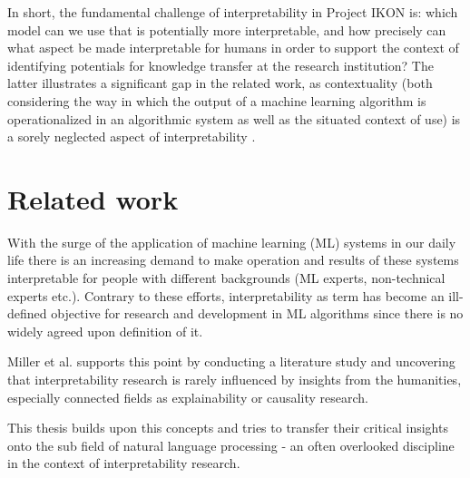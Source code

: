 \documentclass[pdftex,a4paper,12pt]{scrartcl}
\begin{document}
In short, the fundamental challenge of interpretability in Project IKON is: which model can we use that is potentially more interpretable, and how precisely can what aspect be made interpretable for humans in order to support the context of identifying potentials for knowledge transfer at the research institution? The latter illustrates a significant gap in the related work, as contextuality (both considering the way in which the output of a machine learning algorithm is operationalized in an algorithmic system as well as the situated context of use) is a sorely neglected aspect of interpretability \cite{millerExplanationArtificialIntelligence2017}.

\section{Related work}

With the surge of the application of machine learning (ML) systems in our daily life there is an increasing demand to make operation and results of these systems interpretable for people with different backgrounds (ML experts, non-technical experts etc.). Contrary to these efforts, interpretability as term has become an ill-defined objective \cite{liptonMythosModelInterpretability2016}  for research and development in ML algorithms since there is no widely agreed upon definition of it. 

Miller et al. \cite{millerExplainableAIBeware2017} supports this point by conducting a literature study and uncovering that interpretability research is rarely influenced by insights from the humanities, especially connected fields as explainability or causality research.

This thesis builds upon this concepts  and tries to transfer their critical insights onto the sub field of natural language processing - an often overlooked discipline in the context of interpretability research. 
\end{document}
